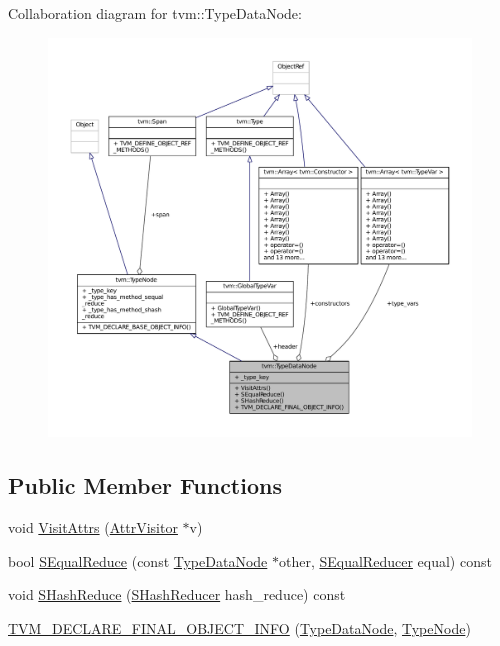 Collaboration diagram for tvm\+:\+:Type\+Data\+Node\+:
\nopagebreak
\begin{figure}[H]
\begin{center}
\leavevmode
\includegraphics[width=350pt]{classtvm_1_1TypeDataNode__coll__graph}
\end{center}
\end{figure}
\subsection*{Public Member Functions}
\begin{DoxyCompactItemize}
\item 
void \hyperlink{classtvm_1_1TypeDataNode_aa8db517fa4778bf6c3f2106133fba7d5}{Visit\+Attrs} (\hyperlink{classtvm_1_1AttrVisitor}{Attr\+Visitor} $\ast$v)
\item 
bool \hyperlink{classtvm_1_1TypeDataNode_ab7ebb91263a4262e63910ae4bfc8deb7}{S\+Equal\+Reduce} (const \hyperlink{classtvm_1_1TypeDataNode}{Type\+Data\+Node} $\ast$other, \hyperlink{classtvm_1_1SEqualReducer}{S\+Equal\+Reducer} equal) const 
\item 
void \hyperlink{classtvm_1_1TypeDataNode_a66e9988584461e9d3d737f32386aeaad}{S\+Hash\+Reduce} (\hyperlink{classtvm_1_1SHashReducer}{S\+Hash\+Reducer} hash\+\_\+reduce) const 
\item 
\hyperlink{classtvm_1_1TypeDataNode_aafa7068fe3f0cf2052c4d1ceb59910f1}{T\+V\+M\+\_\+\+D\+E\+C\+L\+A\+R\+E\+\_\+\+F\+I\+N\+A\+L\+\_\+\+O\+B\+J\+E\+C\+T\+\_\+\+I\+N\+FO} (\hyperlink{classtvm_1_1TypeDataNode}{Type\+Data\+Node}, \hyperlink{classtvm_1_1TypeNode}{Type\+Node})
\end{DoxyCompactItemize}
